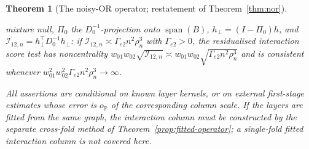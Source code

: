 \documentclass[12pt]{article}
\newtheorem{theorem}{Theorem}
\newcommand{\1}{\mathbf{1}}
\begin{document}
\begin{theorem}[The noisy-OR operator; restatement of Theorem~\ref{thm:nor}]
\begin{enumerate}
mixture null, $\Pi_0$ the $D_0^{-1}$-projection onto $\operatorname{span}(B)$, $h_\perp=(I-\Pi_0)h$,
and $\mathcal I_{12,n}=h_\perp^\top D_0^{-1}h_\perp$: if
$\mathcal I_{12,n}\asymp\Gamma_{e2}n^2\rho_n^3$ with $\Gamma_{e2}>0$, the residualised interaction
score test has noncentrality $w_{01}w_{02}\sqrt{\mathcal I_{12,n}}\asymp
w_{01}w_{02}\sqrt{\Gamma_{e2}n^2\rho_n^3}$ and is consistent whenever
$w_{01}^2w_{02}^2\Gamma_{e2}n^2\rho_n^3\to\infty$.
\end{enumerate}
All assertions are conditional on known layer kernels, or on external first-stage estimates whose
error is $o_{\mathbb P}$ of the corresponding column scale. If the layers are fitted from the same
graph, the interaction column must be constructed by the separate cross-fold method of
Theorem~\ref{prop:fitted-operator}; a single-fold fitted interaction column is not covered here.
\end{theorem}
\end{document}
